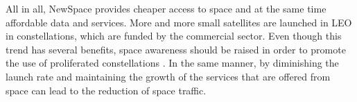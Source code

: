 All in all, NewSpace provides cheaper access to space and at the same time affordable data and services. More and more small satellites are launched in LEO in constellations, which are funded by the commercial sector. Even though this trend has several benefits, space awareness should be raised in order to promote the use of proliferated constellations \cite{pLEO}. In the same manner, by diminishing the launch rate and maintaining the growth of the services that are offered from space can lead to the reduction of space traffic. %


